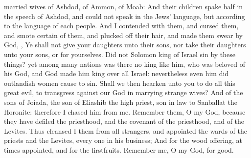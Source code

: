 {married
wives of
Ashdod, of
Ammon,
{} of
Moab:
And their
children
spake
half in the speech of
Ashdod, and
could not
speak in the
Jews’ language, but according to the
language of
each
people.
And I
contended with them, and
cursed them, and
smote
certain of them, and plucked off their
hair, and made them
swear by
God,
{}, Ye shall not
give your
daughters unto their
sons, nor
take their
daughters unto your
sons, or for yourselves.
Did not
Solomon
king of
Israel
sin by these things? yet among
many
nations was there no
king like him, who was
beloved of his
God, and
God
made him
king over all
Israel: nevertheless even
him did
outlandish
women cause to
sin.
Shall we then
hearken unto you to
do all this
great
evil, to
transgress against our
God in
marrying
strange
wives?
And
{} of the
sons of
Joiada, the
son of
Eliashib the
high
priest,
{} son in
law to
Sanballat the
Horonite: therefore I
chased him from me.
Remember them, O my
God, because they have
defiled the
priesthood, and the
covenant of the
priesthood, and of the
Levites.
Thus
cleansed I them from all
strangers, and
appointed the
wards of the
priests and the
Levites, every
one in his
business;
And for the
wood
offering, at
times
appointed, and for the
firstfruits.
Remember me, O my
God, for
good.
\par }